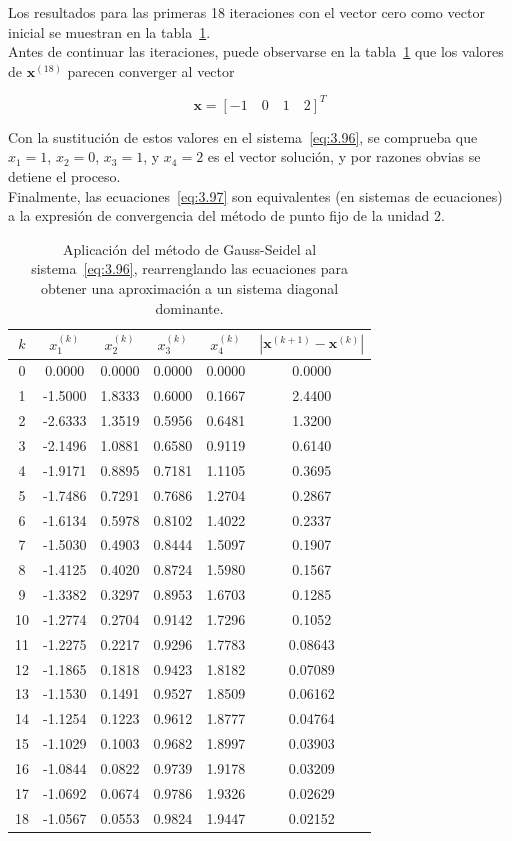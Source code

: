 \documentclass[12pt,letterpaper]{article}
\theoremstyle{definition}
\theoremstyle{plain}
\theoremstyle{remark}
\begin{document}
Los resultados para las primeras 18 iteraciones con el vector cero como vector inicial se muestran en la tabla~\ref{tab:3.4}.\\

Antes de continuar las iteraciones, puede observarse en la tabla~\ref{tab:3.4} que los valores de $\mathbf{x}^{(18)}$ parecen converger al vector

\[
\mathbf{x} = [-1 \quad 0 \quad 1 \quad 2]^T
\]

Con la sustitución de estos valores en el sistema~\eqref{eq:3.96}, se comprueba que $x_1 = 1$, $x_2 = 0$, $x_3 = 1$, y $x_4 = 2$ es el vector solución, y por razones obvias se detiene el proceso.\\

Finalmente, las ecuaciones~\eqref{eq:3.97} son equivalentes (en sistemas de ecuaciones) a la expresión de convergencia del método de punto fijo de la unidad 2.

\begin{table}[h!]
\centering
\caption{Aplicación del método de Gauss-Seidel al sistema~\eqref{eq:3.96}, rearrenglando las ecuaciones para obtener una aproximación a un sistema diagonal dominante.}
\label{tab:3.4}
\begin{tabular}{c|c c c c|c}
$k$ & $x_1^{(k)}$ & $x_2^{(k)}$ & $x_3^{(k)}$ & $x_4^{(k)}$ & $|\mathbf{x}^{(k+1)} - \mathbf{x}^{(k)}|$ \\
\hline
0 & 0.0000 & 0.0000 & 0.0000 & 0.0000 & 0.0000 \\
1 & -1.5000 & 1.8333 & 0.6000 & 0.1667 & 2.4400 \\
2 & -2.6333 & 1.3519 & 0.5956 & 0.6481 & 1.3200 \\
3 & -2.1496 & 1.0881 & 0.6580 & 0.9119 & 0.6140 \\
4 & -1.9171 & 0.8895 & 0.7181 & 1.1105 & 0.3695 \\
5 & -1.7486 & 0.7291 & 0.7686 & 1.2704 & 0.2867 \\
6 & -1.6134 & 0.5978 & 0.8102 & 1.4022 & 0.2337 \\
7 & -1.5030 & 0.4903 & 0.8444 & 1.5097 & 0.1907 \\
8 & -1.4125 & 0.4020 & 0.8724 & 1.5980 & 0.1567 \\
9 & -1.3382 & 0.3297 & 0.8953 & 1.6703 & 0.1285 \\
10 & -1.2774 & 0.2704 & 0.9142 & 1.7296 & 0.1052 \\
11 & -1.2275 & 0.2217 & 0.9296 & 1.7783 & 0.08643 \\
12 & -1.1865 & 0.1818 & 0.9423 & 1.8182 & 0.07089 \\
13 & -1.1530 & 0.1491 & 0.9527 & 1.8509 & 0.06162 \\
14 & -1.1254 & 0.1223 & 0.9612 & 1.8777 & 0.04764 \\
15 & -1.1029 & 0.1003 & 0.9682 & 1.8997 & 0.03903 \\
16 & -1.0844 & 0.0822 & 0.9739 & 1.9178 & 0.03209 \\
17 & -1.0692 & 0.0674 & 0.9786 & 1.9326 & 0.02629 \\
18 & -1.0567 & 0.0553 & 0.9824 & 1.9447 & 0.02152
\end{tabular}
\end{table}
\end{document}
